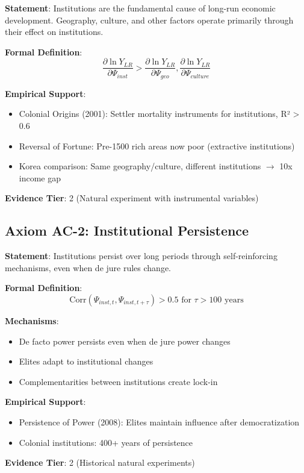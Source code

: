 \begin{tcolorbox}[colback=blue!5!white,colframe=blue!75!black,title=Axiom AC-1: Institutional Primacy]
\textbf{Statement}: Institutions are the fundamental cause of long-run economic development. Geography, culture, and other factors operate primarily through their effect on institutions.

\textbf{Formal Definition}:
\begin{equation}
\frac{\partial \ln Y_{LR}}{\partial \Psi_{inst}} > \frac{\partial \ln Y_{LR}}{\partial \Psi_{geo}}, \frac{\partial \ln Y_{LR}}{\partial \Psi_{culture}}
\end{equation}

\textbf{Empirical Support}:
\begin{itemize}
    \item Colonial Origins (2001): Settler mortality instruments for institutions, R² > 0.6
    \item Reversal of Fortune: Pre-1500 rich areas now poor (extractive institutions)
    \item Korea comparison: Same geography/culture, different institutions $\rightarrow$ 10x income gap
\end{itemize}

\textbf{Evidence Tier}: 2 (Natural experiment with instrumental variables)
\end{tcolorbox}

\subsection{Axiom AC-2: Institutional Persistence}

\begin{tcolorbox}[colback=blue!5!white,colframe=blue!75!black,title=Axiom AC-2: Institutional Persistence]
\textbf{Statement}: Institutions persist over long periods through self-reinforcing mechanisms, even when de jure rules change.

\textbf{Formal Definition}:
\begin{equation}
\text{Corr}(\Psi_{inst,t}, \Psi_{inst,t+\tau}) > 0.5 \text{ for } \tau > 100 \text{ years}
\end{equation}

\textbf{Mechanisms}:
\begin{itemize}
    \item De facto power persists even when de jure power changes
    \item Elites adapt to institutional changes
    \item Complementarities between institutions create lock-in
\end{itemize}

\textbf{Empirical Support}:
\begin{itemize}
    \item Persistence of Power (2008): Elites maintain influence after democratization
    \item Colonial institutions: 400+ years of persistence
\end{itemize}

\textbf{Evidence Tier}: 2 (Historical natural experiments)
\end{tcolorbox}

